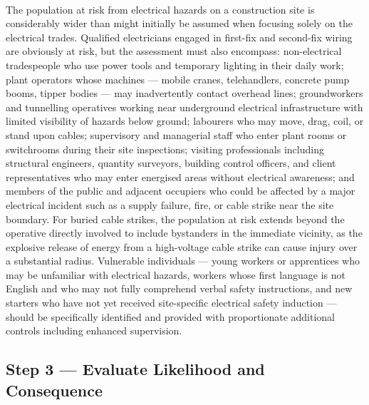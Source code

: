 \paragraph{}
The population at risk from electrical hazards on a construction site is considerably wider than might initially be assumed when focusing solely on the electrical trades. Qualified electricians engaged in first-fix and second-fix wiring are obviously at risk, but the assessment must also encompass: non-electrical tradespeople who use power tools and temporary lighting in their daily work; plant operators whose machines --- mobile cranes, telehandlers, concrete pump booms, tipper bodies --- may inadvertently contact overhead lines; groundworkers and tunnelling operatives working near underground electrical infrastructure with limited visibility of hazards below ground; labourers who may move, drag, coil, or stand upon cables; supervisory and managerial staff who enter plant rooms or switchrooms during their site inspections; visiting professionals including structural engineers, quantity surveyors, building control officers, and client representatives who may enter energised areas without electrical awareness; and members of the public and adjacent occupiers who could be affected by a major electrical incident such as a supply failure, fire, or cable strike near the site boundary. For buried cable strikes, the population at risk extends beyond the operative directly involved to include bystanders in the immediate vicinity, as the explosive release of energy from a high-voltage cable strike can cause injury over a substantial radius. Vulnerable individuals --- young workers or apprentices who may be unfamiliar with electrical hazards, workers whose first language is not English and who may not fully comprehend verbal safety instructions, and new starters who have not yet received site-specific electrical safety induction --- should be specifically identified and provided with proportionate additional controls including enhanced supervision.

\subsection{Step 3 --- Evaluate Likelihood and Consequence}

